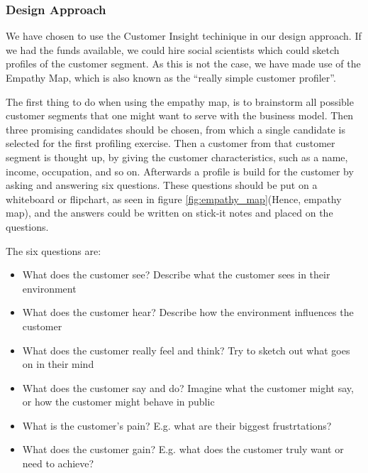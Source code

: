 \subsubsection{Design Approach}
We have chosen to use the Customer Insight\cite{1} techinique in our design approach. If we had the funds available, we could hire social scientists which could sketch profiles of the customer segment. As this is not the case, we have made use of the Empathy Map, which is also known as the ``really simple customer profiler''\cite{2}.

The first thing to do when using the empathy map, is to brainstorm all possible customer segments that one might want to serve with the business model. Then three promising candidates should be chosen, from which a single candidate is selected for the first profiling exercise. Then a customer from that customer segment is thought up, by giving the customer characteristics, such as a name, income, occupation, and so on. Afterwards a profile is build for the customer by asking and answering six questions.
These questions should be put on a whiteboard or flipchart, as seen in figure \ref{fig:empathy_map}(Hence, empathy map), and the answers could be written on stick-it notes and placed on the questions.

The six questions are\cite{2}:
\begin{itemize}
\item What does the customer see? Describe what the customer sees in their environment
\item What does the customer hear? Describe how the environment influences the customer
\item What does the customer really feel and think? Try to sketch out what goes on in their mind
\item What does the customer say and do? Imagine what the customer might say, or how the customer might behave in public
\item What is the customer's pain? E.g. what are their biggest frustrtations?
\item What does the customer gain? E.g. what does the customer truly want or need to achieve?
\end{itemize}

